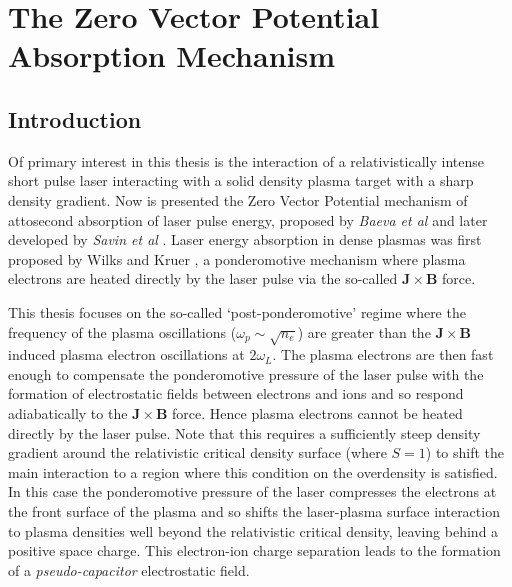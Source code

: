 \chapter{\label{ch:2-zvp}The Zero Vector Potential Absorption Mechanism}

\minitoc

\section{Introduction}
Of primary interest in this thesis is the interaction of a relativistically intense short pulse laser interacting with a solid density plasma target with a sharp density gradient. Now is presented the Zero Vector Potential mechanism of attosecond absorption of laser pulse energy, proposed by \textit{Baeva et al} \cite{baeva_2006_TheoryHighorderHarmonic} and later developed by \textit{Savin et al} \cite{savin2017AttosecondscaleAbsorptionExtreme,savin2019EnergyAbsorptionLaserQED}. Laser energy absorption in dense plasmas was first proposed by Wilks and Kruer \cite{wilks1997}, a ponderomotive mechanism where plasma electrons are heated directly by the laser pulse via the so-called $\mathbf{J}\times \mathbf{B}$ force.


This thesis focuses on the so-called `post-ponderomotive' regime where the frequency of the plasma oscillations ($\omega_p \sim \sqrt{n_e}$) are greater than the $\mathbf{J}\times \mathbf{B}$ induced plasma electron oscillations at $2\omega_L$. The plasma electrons are then fast enough to compensate the ponderomotive pressure of the laser pulse with the formation of electrostatic fields between electrons and ions and so respond adiabatically to the $\mathbf{J}\times \mathbf{B}$ force. Hence plasma electrons cannot be heated directly by the laser pulse. Note that this requires a sufficiently steep density gradient around the relativistic critical density surface (where $S=1$) to shift the main interaction to a region where this condition on the overdensity is satisfied. In this case the ponderomotive pressure of the laser compresses the electrons at the front surface of the plasma and so shifts the laser-plasma surface interaction to plasma densities well beyond the relativistic critical density, leaving behind a positive space charge. This electron-ion charge separation leads to the formation of a \textit{pseudo-capacitor} electrostatic field.



